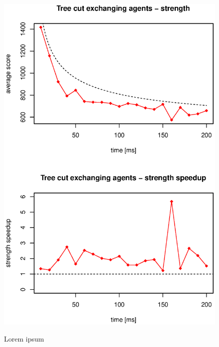 \begin{figure}
\begin{center}
\includegraphics{img/tree-cut-strength.eps}
\end{center}
\caption{\footnotesize Lorem ipsum}{\footnotesize }
\label{fig_tree_cut_strength}
\end{figure}

